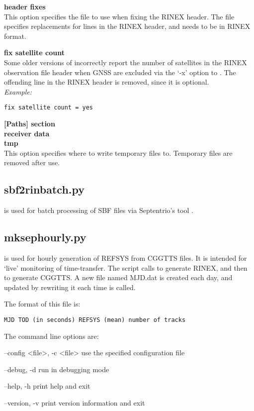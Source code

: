 {\bfseries header fixes}\\
This option specifies the file to use when fixing the RINEX header. The file specifies replacements for lines in the
RINEX header, and needs to be in RINEX format.

{\bfseries fix satellite count}\\
Some older versions of  incorrectly report the number of satellites in the RINEX observation file header
when GNSS are excluded via the `-x' option to . The offending line in the RINEX header is removed, since
it is optional.\\
\textit{Example:}
\begin{lstlisting}
fix satellite count = yes 
\end{lstlisting}

{\bfseries [Paths] section}\\

{\bfseries receiver data}\\

{\bfseries tmp}\\
This option specifies where to write temporary files to.
Temporary files are removed after use.

\subsection{sbf2rinbatch.py}

 is used for batch processing of SBF files via Septentrio's tool .

\subsection{mksephourly.py}

 is used for hourly generation of REFSYS from CGGTTS files. 
It is intended for `live' monitoring of time-transfer.
The script calls  to generate RINEX, and then  to generate CGGTTS.
A new file named MJD.dat is created each day, and updated by rewriting it each time  is called.

The format of this file is:
\begin{lstlisting}
MJD TOD (in seconds) REFSYS (mean) number of tracks
\end{lstlisting}

The command line options are:
\begin{description*}
	\item[--config \textless{file}\textgreater, -c \textless{file}\textgreater] use the specified configuration file
	\item[--debug, -d]	run in debugging mode
	\item[--help, -h]	print help and exit
	\item[--version, -v]	print version information and exit
\end{description*}

